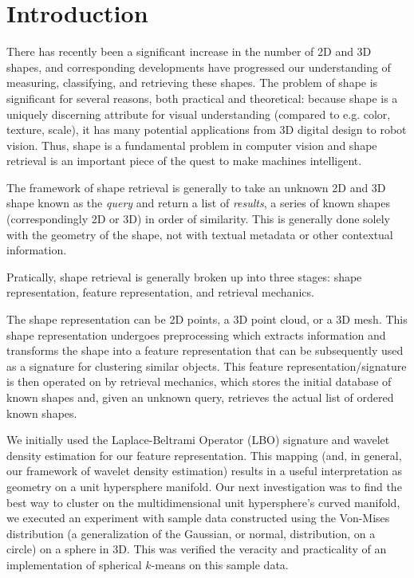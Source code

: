 \documentclass[../tech_report_1.tex]{subfiles}
\begin{document}
\section{Introduction}

There has recently been a significant increase in the number of 2D and 3D shapes, and corresponding developments have progressed our understanding of measuring, classifying, and retrieving these shapes. The problem of shape is significant for several reasons, both practical and theoretical: because shape is a uniquely discerning attribute for visual understanding (compared to e.g. color, texture, scale), it has many potential applications from 3D digital design to robot vision. Thus, shape is a fundamental problem in computer vision and shape retrieval is an important piece of the quest to make machines intelligent.

The framework of shape retrieval is generally to take an unknown 2D and 3D shape known as the \textit{query} and return a list of \textit{results}, a series of known shapes (correspondingly 2D or 3D) in order of similarity. This is generally done solely with the geometry of the shape, not with textual metadata or other contextual information.

Pratically, shape retrieval is generally broken up into three stages:
shape representation, feature representation, and retrieval mechanics.

The shape representation can be 2D points, a 3D point cloud, or a 3D mesh. This shape representation undergoes preprocessing which extracts information and transforms the shape into a feature representation that can be subsequently used as a signature for clustering similar objects. This feature representation/signature is then operated on by retrieval mechanics, which stores the initial database of known shapes and, given an unknown query, retrieves the actual list of ordered known shapes.

We initially used the Laplace-Beltrami Operator (LBO) signature and wavelet density estimation for our feature representation. This mapping (and, in general, our framework of wavelet density estimation) results in a useful interpretation as geometry on a unit hypersphere manifold. Our next investigation was to find the best way to cluster on the multidimensional unit hypersphere's curved manifold, we executed an experiment with sample data constructed using the Von-Mises distribution (a generalization of the Gaussian, or normal, distribution, on a circle) on a sphere in 3D. This was verified the veracity and practicality of an implementation of spherical $k$-means on this sample data.
\end{document}
